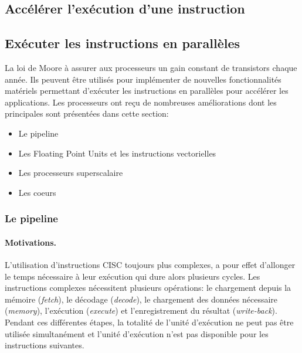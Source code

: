 \subsection{Accélérer l'exécution d'une instruction}

















\subsection{Exécuter les instructions en parallèles}

La loi de Moore à assurer aux processeurs un gain constant de transistors chaque année. Ils peuvent être utilisés pour implémenter de nouvelles fonctionnalités matériels permettant d'exécuter les instructions en parallèles pour accélérer les applications. Les processeurs ont reçu de nombreuses améliorations dont les principales sont présentées dans cette section: 

\begin{itemize}
    \item Le pipeline
    \item Les Floating Point Units et les instructions vectorielles
    \item Les processeurs superscalaire
    \item Les coeurs
\end{itemize}


\subsubsection{Le pipeline} \label{sec:pipeline}


\paragraph{Motivations.} 

L'utilisation d'instructions CISC toujours plus complexes, a pour effet d'allonger le temps nécessaire à leur exécution qui dure alors plusieurs cycles. Les instructions complexes nécessitent plusieurs opérations: le chargement depuis la mémoire (\textit{fetch}), le décodage (\textit{decode}), le chargement des données nécessaire (\textit{memory}), l'exécution (\textit{execute}) et l'enregistrement du résultat (\textit{write-back}). Pendant ces différentes étapes, la totalité de l'unité d'exécution ne peut pas être utilisée simultanément et l'unité d'exécution n'est pas disponible pour les instructions suivantes. 

